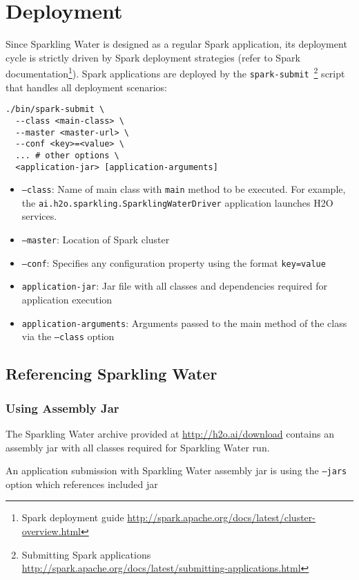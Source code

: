 \section{Deployment}
Since Sparkling Water is designed as a regular Spark application, its deployment cycle is strictly driven by Spark
deployment strategies (refer to Spark documentation\footnote{Spark deployment guide \url{http://spark.apache.org/docs/latest/cluster-overview.html}}).
Spark applications are deployed by the \texttt{spark-submit}~\footnote{Submitting Spark applications \url{http://spark.apache.org/docs/latest/submitting-applications.html}}
script that handles all deployment scenarios:

\begin{lstlisting}[style=Bash]
./bin/spark-submit \
  --class <main-class> \
  --master <master-url> \
  --conf <key>=<value> \
  ... # other options \
  <application-jar> [application-arguments]
\end{lstlisting}

\begin{itemize}
	\item \texttt{--class}: Name of main class with \texttt{main} method to be executed. For example, the \texttt{ai.h2o.sparkling.SparklingWaterDriver} application launches H2O services.
	\item \texttt{--master}: Location of Spark cluster
	\item \texttt{--conf}: Specifies any configuration property using the format \texttt{key=value}
	\item \texttt{application-jar}: Jar file with all classes and dependencies required for application execution
	\item \texttt{application-arguments}: Arguments passed to the main method of the class via the \texttt{--class} option
\end{itemize}

\subsection{Referencing Sparkling Water}

\subsubsection{Using Assembly Jar}
The Sparkling Water archive provided at \url{http://h2o.ai/download} contains an assembly jar with all classes required for Sparkling Water run.

An application submission with Sparkling Water assembly jar is using the \texttt{--jars} option which references included jar

